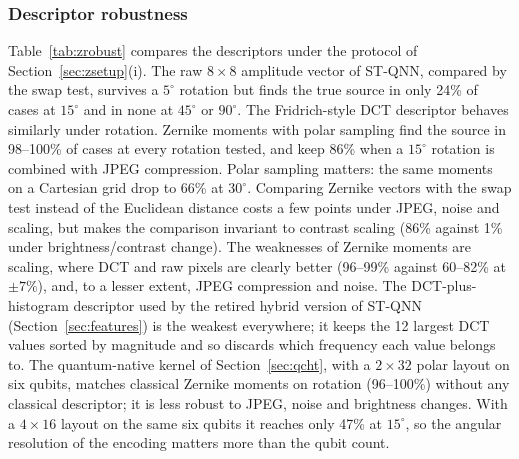 \documentclass[conference]{IEEEtran}
\begin{document}
\subsubsection{Descriptor robustness}
Table~\ref{tab:zrobust} compares the descriptors under the protocol of Section~\ref{sec:zsetup}(i). The raw $8\times8$ amplitude vector of ST-QNN, compared by the swap test, survives a $5^\circ$ rotation but finds the true source in only 24\% of cases at $15^\circ$ and in none at $45^\circ$ or $90^\circ$. The Fridrich-style DCT descriptor behaves similarly under rotation. Zernike moments with polar sampling find the source in 98--100\% of cases at every rotation tested, and keep 86\% when a $15^\circ$ rotation is combined with JPEG compression. Polar sampling matters: the same moments on a Cartesian grid drop to 66\% at $30^\circ$. Comparing Zernike vectors with the swap test instead of the Euclidean distance costs a few points under JPEG, noise and scaling, but makes the comparison invariant to contrast scaling (86\% against 1\% under brightness/contrast change). The weaknesses of Zernike moments are scaling, where DCT and raw pixels are clearly better (96--99\% against 60--82\% at $\pm7\%$), and, to a lesser extent, JPEG compression and noise. The DCT-plus-histogram descriptor used by the retired hybrid version of ST-QNN (Section~\ref{sec:features}) is the weakest everywhere; it keeps the 12 largest DCT values sorted by magnitude and so discards which frequency each value belongs to. The quantum-native kernel of Section~\ref{sec:qcht}, with a $2\times32$ polar layout on six qubits, matches classical Zernike moments on rotation (96--100\%) without any classical descriptor; it is less robust to JPEG, noise and brightness changes. With a $4\times16$ layout on the same six qubits it reaches only 47\% at $15^\circ$, so the angular resolution of the encoding matters more than the qubit count.
\end{document}
